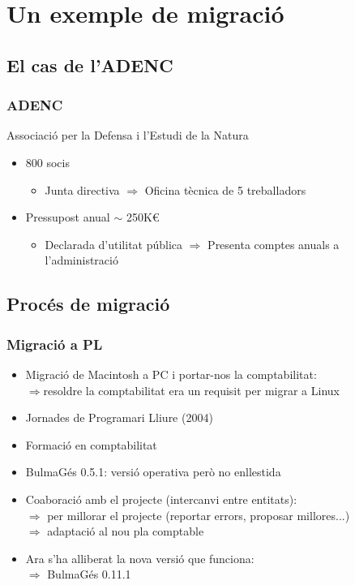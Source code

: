 \documentclass{beamer}
\begin{document}
\section{Un exemple de migració}
\subsection{El cas de l'ADENC}
\begin{frame}\frametitle{ADENC} 
\begin{block}{}
Associació per la Defensa i l'Estudi de la Natura
\end{block}
\begin{itemize}
 \item 800 socis 
    \begin{itemize}
        \item Junta directiva $\Rightarrow$ Oficina tècnica de 5 treballadors
    \end{itemize}
 \item Pressupost anual $\sim$ 250K\euro
    \begin{itemize}
        \item Declarada d'utilitat pública $\Rightarrow$ Presenta comptes anuals a l'administració
    \end{itemize}
\end{itemize}
\end{frame}

\subsection{Procés de migració}
\begin{frame}\frametitle{Migració a PL} 
\begin{itemize}
\item Migració de Macintosh a PC i portar-nos la comptabilitat: \\
  $\Rightarrow$resoldre la comptabilitat era un requisit per migrar a Linux
\item Jornades de Programari Lliure (2004)
\item Formació en comptabilitat
\item BulmaGés 0.5.1: versió operativa però no enllestida
\item Co\lgem aboració amb el projecte (intercanvi entre entitats): \\
  $\Rightarrow$ per millorar el projecte (reportar errors, proposar millores...)\\
  $\Rightarrow$ adaptació al nou pla comptable
\item Ara s'ha alliberat la nova versió que funciona:\\
  $\Rightarrow$ BulmaGés 0.11.1
\end{itemize}
\end{frame}
\end{document}
